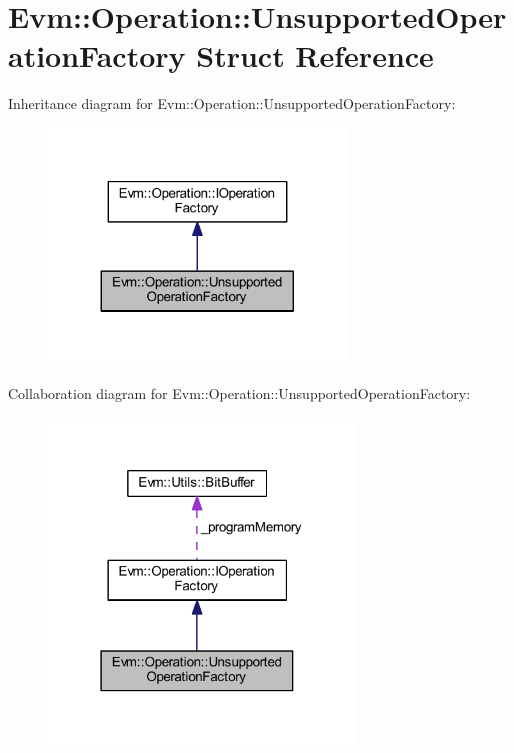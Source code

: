 \hypertarget{struct_evm_1_1_operation_1_1_unsupported_operation_factory}{}\section{Evm\+:\+:Operation\+:\+:Unsupported\+Operation\+Factory Struct Reference}
\label{struct_evm_1_1_operation_1_1_unsupported_operation_factory}


Inheritance diagram for Evm\+:\+:Operation\+:\+:Unsupported\+Operation\+Factory\+:
\nopagebreak
\begin{figure}[H]
\begin{center}
\leavevmode
\includegraphics[width=224pt]{struct_evm_1_1_operation_1_1_unsupported_operation_factory__inherit__graph}
\end{center}
\end{figure}


Collaboration diagram for Evm\+:\+:Operation\+:\+:Unsupported\+Operation\+Factory\+:
\nopagebreak
\begin{figure}[H]
\begin{center}
\leavevmode
\includegraphics[width=231pt]{struct_evm_1_1_operation_1_1_unsupported_operation_factory__coll__graph}
\end{center}
\end{figure}
